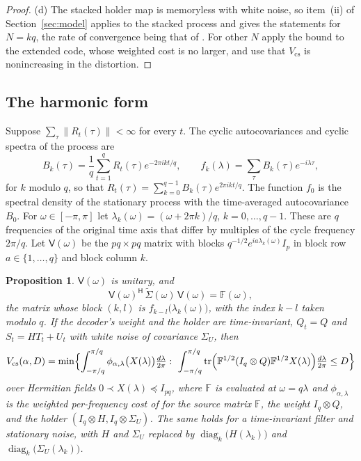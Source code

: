 \documentclass[11pt,onecolumn]{IEEEtran}
\newtheorem{proposition}[theorem]{Proposition}
\newcommand{\tr}{\operatorname{tr}}
\newcommand{\dl}{\tfrac{d\lambda}{2\pi}}
\newcommand{\herm}{\mathsf H}
\newcommand{\tS}{\tilde\Sigma}
\newcommand{\cF}{\mathbb F}
\begin{document}
\begin{proof}
(d) The stacked holder map is memoryless with white noise, so item~(ii)
of Section~\ref{sec:model} applies to the stacked process and gives the
statements for $N=kq$, the rate of convergence being that of
\cite[Theorem~15(b),(c)]{part2}. For other $N$ apply the bound to the
extended code, whose weighted cost is no larger, and use that
$V_{\mathrm{cs}}$ is nonincreasing in the distortion.
\end{proof}

\subsection{The harmonic form}

Suppose $\sum_\tau\|R_t(\tau)\|<\infty$ for every $t$. The cyclic
autocovariances and cyclic spectra of the process are
\[
B_k(\tau)=\frac1q\sum_{t=1}^qR_t(\tau)e^{-2\pi ikt/q},\qquad
f_k(\lambda)=\sum_\tau B_k(\tau)e^{-i\lambda\tau},
\]
for $k$ modulo $q$, so that
$R_t(\tau)=\sum_{k=0}^{q-1}B_k(\tau)e^{2\pi ikt/q}$. The function $f_0$ is
the spectral density of the stationary process with the time-averaged
autocovariance $B_0$. For $\omega\in[-\pi,\pi]$ let
$\lambda_k(\omega)=(\omega+2\pi k)/q$, $k=0,\dots,q-1$. These are $q$
frequencies of the original time axis that differ by multiples of the
cycle frequency $2\pi/q$. Let $\mathsf V(\omega)$ be the $pq\times pq$
matrix with blocks $q^{-1/2}e^{ia\lambda_k(\omega)}I_p$ in block row
$a\in\{1,\dots,q\}$ and block column $k$.

\begin{proposition}\label{prop:harmonic}
$\mathsf V(\omega)$ is unitary, and
\[
\mathsf V(\omega)^{\herm}\,\tS(\omega)\,\mathsf V(\omega)=\cF(\omega),
\]
the matrix whose block $(k,l)$ is $f_{k-l}\bigl(\lambda_k(\omega)\bigr)$,
with the index $k-l$ taken modulo $q$. If the decoder's weight and the
holder are time-invariant, $Q_t=Q$ and $S_t=HT_t+U_t$ with white noise
of covariance $\Sigma_U$, then
\begin{equation}
V_{\mathrm{cs}}(\alpha,D)=\min\Bigl\{\int_{-\pi/q}^{\pi/q}\phi_{\alpha,\lambda}\bigl(X(\lambda)\bigr)\dl:\
\int_{-\pi/q}^{\pi/q}\tr\Bigl(\cF^{1/2}(I_q\otimes Q)\cF^{1/2}X(\lambda)\Bigr)\dl\le D\Bigr\}
\label{eq:coset}
\end{equation}
over Hermitian fields $0\prec X(\lambda)\preceq I_{pq}$, where $\cF$ is
evaluated at $\omega=q\lambda$ and $\phi_{\alpha,\lambda}$ is the weighted
per-frequency cost of \cite{part2} for the source matrix $\cF$, the
weight $I_q\otimes Q$, and the holder
$(I_q\otimes H,I_q\otimes\Sigma_U)$. The same holds for a time-invariant
filter and stationary noise, with $H$ and $\Sigma_U$ replaced by
$\operatorname{diag}_k\bigl(H(\lambda_k)\bigr)$ and
$\operatorname{diag}_k\bigl(\Sigma_U(\lambda_k)\bigr)$.
\end{proposition}
\end{document}
